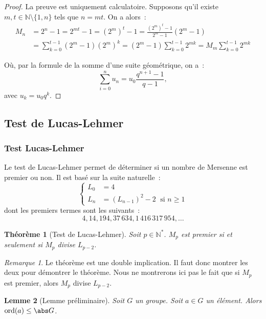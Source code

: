 \documentclass[10pt, mathserif]{beamer}
\DeclareMathOperator{\ord}{ord}
\newcommand{\N}{\mathbb N}
\newtheorem{thm}{Théorème}[section]
\newtheorem{lem}[thm]{Lemme}
\theoremstyle{definition}
\theoremstyle{remark}
\newtheorem*{rmq}{Remarque}
\begin{document}
	\begin{frame}
		\begin{proof}
			La preuve est uniquement calculatoire. Supposons qu'il existe $m, t \in \N \setminus \{1, n\}$ tels que $n = mt$. On a alors~:
			\[\begin{aligned}
				M_n &= 2^n-1
				    = 2^{mt}-1
				    = \left(2^m\right)^t - 1
					= \frac {\left(2^m\right)^t - 1}{2^m - 1}\left(2^m - 1\right) \\
					&= \sum_{k=0}^{t-1}\left(2^m - 1\right)\left(2^m\right)^k
					= \left(2^m-1\right)\sum_{k=0}^{t-1}2^{mk}
					= M_m\sum_{k=0}^{t-1}2^{mk}
			\end{aligned}\]

			Où, par la formule de la somme d'une suite géométrique, on a~:
			\[\sum_{i=0}^{n}u_n = u_0\frac {q^{n+1}-1}{q-1},\]
			avec $u_k = u_0q^k$.
		\end{proof}
	\end{frame}

	\subsection{Test de Lucas-Lehmer}
	\begin{frame}
		\frametitle{Test Lucas-Lehmer}
		Le test de Lucas-Lehmer permet de déterminer si un nombre de Mersenne est premier ou non. Il est basé sur la suite naturelle~:
		\[\begin{cases}
			L_0 &= 4 \\
			L_n &= (L_{n-1})^2 - 2 \;\text{ si } n \geq 1
		\end{cases}\]
		dont les premiers termes sont les suivants~:
		\[4, 14, 194, 37\,634, 1\,416\,317\,954, \ldots\]
	\end{frame}

	\begin{frame}
		\begin{thm}[Test de Lucas-Lehmer]
			Soit $p \in \N^*$. $M_p$ est premier si et seulement si $M_p$ divise $L_{p-2}$.
		\end{thm}

		\begin{rmq}
			Le théorème est une double implication. Il faut donc montrer les deux pour démontrer le théorème. Nous ne montrerons ici pas le fait que si $M_p$
			est premier, alors $M_p$ divise $L_{p-2}$.
		\end{rmq}

		\begin{lem}[Lemme préliminaire]
			Soit $G$ un groupe. Soit $a \in G$ un élément. Alors $\ord(a) \leq \abs G$.
		\end{lem}
	\end{frame}
\end{document}
